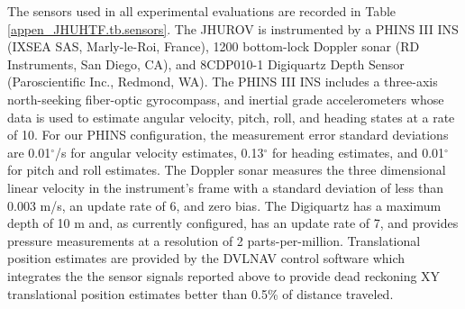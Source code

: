 The sensors used in all experimental evaluations are recorded in Table
\ref{appen_JHUHTF.tb.sensors}.  
%
The \ac{JHUROV} is instrumented by a PHINS III \ac{INS} (IXSEA SAS,
Marly-le-Roi, France), \unit{1200}{\kHz} bottom-lock Doppler sonar (RD
Instruments, San Diego, CA), and 8CDP010-1 Digiquartz Depth Sensor
(Paroscientific Inc., Redmond, WA).  
%
The PHINS III \ac{INS} includes a three-axis north-seeking fiber-optic
gyrocompass, and inertial grade accelerometers whose data is used to
estimate angular velocity, pitch, roll, and heading states at a rate
of \unit{10}{\Hz}.  
%
For our PHINS configuration, the measurement error standard deviations
are 0.01$^\circ$/s for angular velocity estimates, 0.13$^\circ$ for
heading estimates, and 0.01$^\circ$ for pitch and roll
estimates\cite{PhinsManual2008}. The Doppler sonar measures the three
dimensional linear velocity in the instrument's frame with a standard
deviation of less than 0.003 m/s, an update rate of \unit{6}{\Hz}, and
zero bias\cite{NWHdataSheet}.
%
The Digiquartz has a maximum depth of 10 m and, as currently
configured, has an update rate of \unit{7}{\Hz}, and provides pressure
measurements at a resolution of 2 parts-per-million.
%
Translational position estimates are provided by the DVLNAV control
software which integrates the the sensor signals reported above to
provide dead reckoning XY translational position estimates better than
0.5\% of distance traveled.
%







